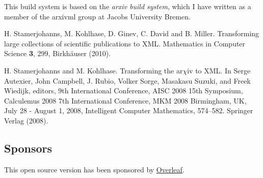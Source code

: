 \documentclass[a4paper]{article}
\begin{document}
This build system is based on the \textit{arxiv build system}, which I have written
as a member of the arxivml group at Jacobs University Bremen.

H. Stamerjohanns, M. Kohlhase, D. Ginev, C. David and B. Miller. Transforming large collections of scientific publications to XML. Mathematics in Computer Science \textbf{3}, 299, Birkhäuser (2010).

H. Stamerjohanns and M. Kohlhase. Transforming the ar$\chi$iv to XML.
In Serge Autexier, John Campbell, J. Rubio, Volker Sorge, Masakasu
Suzuki, and Freek Wiedijk, editors, 9th International Conference,
AISC 2008 15th Symposium, Calculemus 2008 7th International Conference, MKM 2008 Birmingham, UK, July 28 - August 1, 2008, Intelligent Computer Mathematics, 574–582. Springer Verlag (2008).

\subsection{Sponsors}
This open source version has been sponsored by 
\href{https://www.overleaf.com}{Overleaf}.
\end{document}
